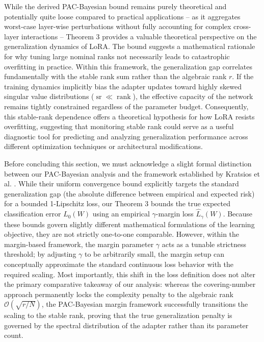 \documentclass[a4paper,14pt]{extarticle}
\DeclareMathOperator{\rank}{rank}
\DeclareMathOperator{\sr}{sr}
\begin{document}
    While the derived PAC-Bayesian bound remains purely theoretical and potentially quite loose compared to practical applications -- as it aggregates worst-case layer-wise perturbations without fully accounting for complex cross-layer interactions -- Theorem 3 provides a valuable theoretical perspective on the generalization dynamics of LoRA. The bound suggests a mathematical rationale for why tuning large nominal ranks not necessarily leads to catastrophic overfitting in practice. Within this framework, the generalization gap correlates fundamentally with the stable rank sum rather than the algebraic rank $r$. If the training dynamics implicitly bias the adapter updates toward highly skewed singular value distributions ($\sr \ll \rank $), the effective capacity of the network remains tightly constrained regardless of the parameter budget. Consequently, this stable-rank dependence offers a theoretical hypothesis for how LoRA resists overfitting, suggesting that monitoring stable rank could serve as a useful diagnostic tool for predicting and analyzing generalization performance across different optimization techniques or architectural modifications.

    Before concluding this section, we must acknowledge a slight formal distinction between our PAC-Bayesian analysis and the framework established by Kratsios et al. \cite{kratsios2025sharpgeneralizationboundsfoundation}. While their uniform convergence bound explicitly targets the standard generalization gap (the absolute difference between empirical and expected risk) for a bounded 1-Lipschitz loss, our Theorem 3 bounds the true expected classification error $L_0(W)$ using an empirical $\gamma$-margin loss $\widehat{L}_\gamma(W)$. Because these bounds govern slightly different mathematical formulations of the learning objective, they are not strictly one-to-one comparable. 
    However, within the margin-based framework, the margin parameter $\gamma$ acts as a tunable strictness threshold; by adjusting $\gamma$ to be arbitrarily small, the margin setup can conceptually approximate the standard continuous loss behavior with the required scaling. Most importantly, this shift in the loss definition does not alter the primary comparative takeaway of our analysis: whereas the covering-number approach permanently locks the complexity penalty to the algebraic rank $\mathcal{O}(\sqrt{r/N})$, the PAC-Bayesian margin framework successfully transitions the scaling to the stable rank, proving that the true generalization penalty is governed by the spectral distribution of the adapter rather than its parameter count.
\end{document}
